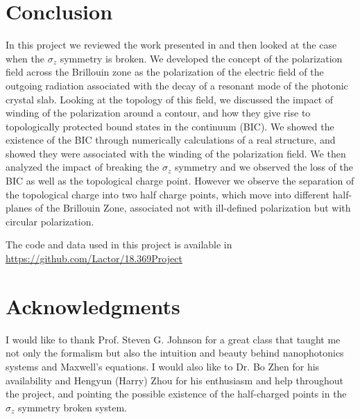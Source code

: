\section{Conclusion}

In this project we reviewed the work presented in \cite{Zhen2014} and then looked at the case when the $\sigma_z$ symmetry is broken. We developed the concept of the polarization field across the Brillouin zone as the polarization of the electric field of the outgoing radiation associated with the decay of a resonant mode of the photonic crystal slab. Looking at the topology of this field, we discussed the impact of winding of the polarization around a contour, and how they give rise to topologically protected bound states in the continuum (BIC). We showed the existence of the BIC through numerically calculations of a real structure, and showed they were associated with the winding of the polarization field. We then analyzed the impact of breaking the $\sigma_z$ symmetry and we observed the loss of the BIC as well as the topological charge point. However we observe the separation of the topological charge into two half charge points, which move into different half-planes of the Brillouin Zone, associated not with ill-defined polarization but with circular polarization.

The code and data used in this project is available in \url{https://github.com/Lactor/18.369Project}

\section{Acknowledgments}

I would like to thank Prof. Steven G. Johnson for a great class that taught me not only the formalism but also the intuition and beauty behind nanophotonics systems and Maxwell's equations. I would also like to Dr. Bo Zhen for his availability and Hengyun (Harry) Zhou for his enthusiasm and help throughout the project, and pointing the possible existence of the half-charged points in the $\sigma_z$ symmetry broken system.





\clearpage
\appendix






























